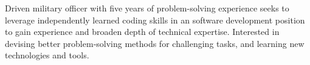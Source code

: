 

\begin{cvparagraph}

Driven military officer with five years of problem-solving experience seeks to leverage independently learned coding skills in an software development position to gain experience and broaden depth of technical expertise. Interested in devising better problem‑solving methods for challenging tasks, and learning new technologies and tools.

\end{cvparagraph}

